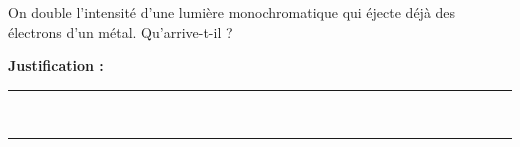 On double l'intensité d'une lumière monochromatique qui éjecte déjà des électrons d'un métal. Qu'arrive-t-il ?

\choices

\noindent\textbf{Justification :} \hrulefill \\[2.5ex]
\rule{\linewidth}{0.4pt} \\[2.5ex]
\rule{\linewidth}{0.4pt}
\vfill
